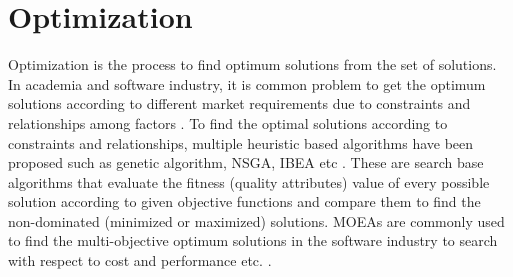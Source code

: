 \section{Optimization}

Optimization is the process to find optimum solutions from the set of solutions. In academia and software industry, it is common problem to get the optimum solutions according to different market requirements due to constraints and relationships among factors \cite{t91, t92}. To find the optimal solutions according to constraints and relationships, multiple heuristic based algorithms have been proposed such as genetic algorithm, NSGA, IBEA etc \cite{t93}. These are search base algorithms that evaluate the fitness (quality attributes) value of every possible solution according to given objective functions and compare them to find the non-dominated (minimized or maximized) solutions. MOEAs are commonly used to find the multi-objective optimum solutions in the software industry to search with respect to cost and performance etc. \cite{t94}.